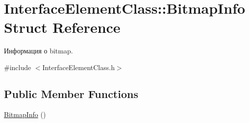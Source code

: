 \hypertarget{struct_interface_element_class_1_1_bitmap_info}{}\section{Interface\+Element\+Class\+:\+:Bitmap\+Info Struct Reference}
\label{struct_interface_element_class_1_1_bitmap_info}


Информация о bitmap.  




{\ttfamily \#include $<$Interface\+Element\+Class.\+h$>$}

\subsection*{Public Member Functions}
\begin{DoxyCompactItemize}
\item 
\hyperlink{struct_interface_element_class_1_1_bitmap_info_a0369722a1aa1455eed9e139ee57e9ee1}{Bitmap\+Info} ()
\end{DoxyCompactItemize}
